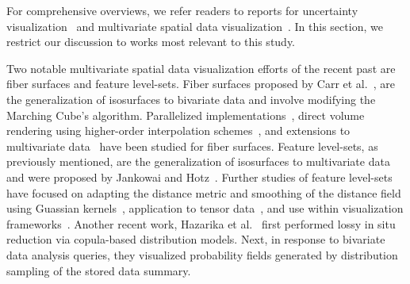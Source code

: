 %
For comprehensive overviews, we refer readers to reports for uncertainty visualization~\cite{Bonneau2014,johnson2003next,potter2011quantification} and multivariate spatial data visualization~\cite{he2019multivariate}.
%
In this section, we restrict our discussion to works most relevant to this study.

Two notable multivariate spatial data visualization efforts of the recent past are fiber surfaces and feature level-sets.
%
Fiber surfaces proposed by Carr et al.~\cite{carr2015fiber}, are the generalization of isosurfaces to bivariate data and involve modifying the Marching Cube's algorithm.
%
Parallelized implementations~\cite{klacansky2016fast}, direct volume rendering using higher-order interpolation schemes~\cite{wu2016direct}, and extensions to multivariate data~\cite{blecha2020fiber} have been studied for fiber surfaces.  
%
Feature level-sets, as previously mentioned, are the generalization of isosurfaces to multivariate data and were proposed by Jankowai and Hotz~\cite{jankowai2020feature}.
%
Further studies of feature level-sets have focused on adapting the distance metric and smoothing of the distance field using Guassian kernels~\cite{nguyen2020visualization}, application to tensor data~\cite{jankowai2020tensor}, and use within visualization frameworks~\cite{jonsson2020inviwo}.
%
%
Another recent work, Hazarika et al.~\cite{hazarika2018codda} first performed lossy in situ reduction via copula-based distribution models. 
%
Next, in response to bivariate data analysis queries, they visualized probability fields generated by distribution sampling of the stored data summary. 
%

%


